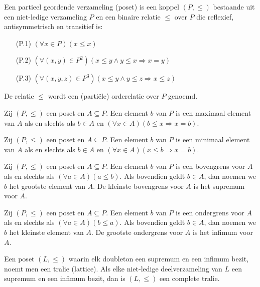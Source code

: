 \begin{definitie}
Een partieel geordende verzameling (poset) is een koppel $(P,\le)$ bestaande uit een niet-ledige
verzameling $P$ en een binaire relatie $\le$ over $P$ die reflexief, antisymmetrisch en 
transitief is:
\begin{itemize}
  \item[(P.1)] $(\forall x \in P)(x \le x)$
  \item[(P.2)] $(\forall (x,y) \in P^2)(x \le y \land y \le x \Rightarrow x = y)$
  \item[(P.3)] $(\forall (x,y,z) \in P^3)(x \le y \land y \le z \Rightarrow x \le z)$
\end{itemize}
De relatie $\le$ wordt een (parti\"ele) orderelatie over $P$ genoemd.
\end{definitie} 
\begin{definitie}
Zij $(P,\le)$ een poset en $A \subseteq P$. Een element $b$ van $P$ is een maximaal element
van $A$ als en slechts als $b \in A$ en $(\forall x \in A)(b \le x \Rightarrow x = b)$. 
\end{definitie}
\begin{definitie}
Zij $(P,\le)$ een poset en $A \subseteq P$. Een element $b$ van $P$ is een minimaal element
van $A$ als en slechts als $b \in A$ en $(\forall x \in A)(x \le b \Rightarrow x = b)$. 
\end{definitie}
\begin{definitie}
Zij $(P,\le)$ een poset en $A \subseteq P$. Een element $b$ van $P$ is een bovengrens voor $A$
als en slechts als $(\forall a \in A)(a \le b)$. Als bovendien geldt $b \in A$, dan noemen
we $b$ het grootste element van $A$. De kleinste bovengrens voor $A$ is het
supremum voor $A$.
\end{definitie}
\begin{definitie}
Zij $(P,\le)$ een poset en $A \subseteq P$. Een element $b$ van $P$ is een ondergrens voor $A$
als en slechts als $(\forall a \in A)(b \le a)$. Als bovendien geldt $b \in A$, dan noemen
we $b$ het kleinste element van $A$. De grootste ondergrens voor $A$ is het
infimum voor $A$.
\end{definitie}
\begin{definitie}
Een poset $(L,\le)$ waarin elk doubleton een supremum en een infimum bezit, noemt men een tralie 
(lattice). Als elke niet-ledige deelverzameling van $L$
een supremum en een infimum bezit, dan is $(L, \le)$ een complete tralie.
\end{definitie}
